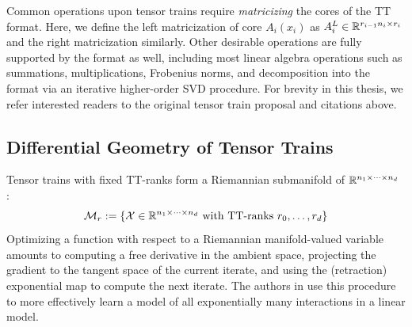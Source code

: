 Common operations upon tensor trains require \textit{matricizing} the cores of the TT format. Here, we define the left matricization of core $A_i(x_i)$ as $A_i^L \in \mathbb{R}^{r_{i-1}n_i \times r_i} $ and the right matricization similarly.
Other desirable operations are fully supported by the format as well,
including most linear algebra operations such as summations,
multiplications, Frobenius norms,
and decomposition into the format via an iterative higher-order SVD procedure.
For brevity in this thesis, we refer interested readers
to the original tensor train proposal and citations above.

\subsection{Differential Geometry of Tensor Trains}
Tensor trains with fixed TT-ranks form a Riemannian submanifold of $\mathbb{R}^{n_1 \times \cdots \times n_d}$ \cite{lubich2015time, holtz2012manifolds}:
\begin{align}\label{eq:riem}
	\mathcal{M}_r := \{ \mathcal{X} \in \mathbb{R}^{n_1 \times \cdots \times n_d} \text{ with TT-ranks } r_0,\ldots,r_d\} 
\end{align}
Optimizing a function with respect to a Riemannian manifold-valued variable amounts to computing a free derivative in the ambient space, projecting the gradient to the tangent space of the current iterate, and using the (retraction) exponential map to compute the next iterate.
The authors in \cite{novikov2016exponential} use this procedure to more effectively learn a model of all exponentially many interactions in a linear model.
